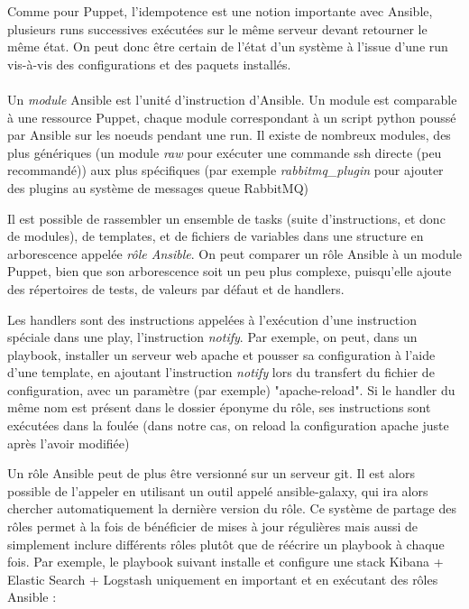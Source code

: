\documentclass[14 pt,a4paper]{extreport}
\begin{document}
Comme pour Puppet, l'idempotence est une notion importante avec Ansible, plusieurs runs successives exécutées sur le même serveur devant retourner le même état. On peut donc être certain de l'état d'un système à l'issue d'une run vis-à-vis des configurations et des paquets installés.

\paragraph*{}Un \emph{module} Ansible est l'unité d'instruction d'Ansible. Un module est comparable à une ressource Puppet, chaque module correspondant à un script python poussé par Ansible sur les noeuds pendant une run. Il existe de nombreux modules, des plus génériques (un module \emph{raw} pour exécuter une commande ssh directe (peu recommandé)) aux plus spécifiques (par exemple \emph{rabbitmq\_plugin} pour ajouter des plugins au système de messages queue RabbitMQ)

Il est possible de rassembler un ensemble de tasks (suite d'instructions, et donc de modules), de templates, et de fichiers de variables dans une structure en arborescence appelée \emph{rôle Ansible}. On peut comparer un rôle Ansible à un module Puppet, bien que son arborescence soit un peu plus complexe, puisqu'elle ajoute des répertoires de tests, de valeurs par défaut et de handlers.

Les handlers sont des instructions appelées à l'exécution d'une instruction spéciale dans une play, l'instruction \emph{notify}. Par exemple, on peut, dans un playbook, installer un serveur web apache et pousser sa configuration à l'aide d'une template, en ajoutant l'instruction \emph{notify} lors du transfert du fichier de configuration, avec un paramètre (par exemple) "apache-reload". Si le handler du même nom est présent dans le dossier éponyme du rôle, ses instructions sont exécutées dans la foulée (dans notre cas, on reload la configuration apache juste après l'avoir modifiée)

Un rôle Ansible peut de plus être versionné sur un serveur git. Il est alors possible de l'appeler en utilisant un outil appelé ansible-galaxy, qui ira alors chercher automatiquement la dernière version du rôle. Ce système de partage des rôles permet à la fois de bénéficier de mises à jour régulières mais aussi de simplement inclure différents rôles plutôt que de réécrire un playbook à chaque fois. Par exemple, le playbook suivant installe et configure une stack Kibana + Elastic Search + Logstash uniquement en important et en exécutant des rôles Ansible :
\end{document}
